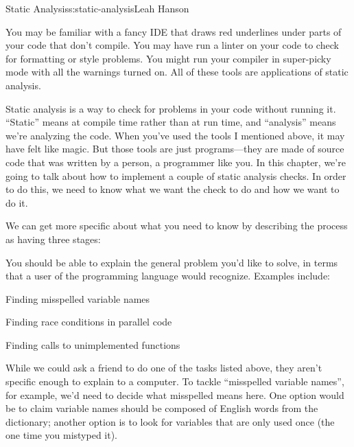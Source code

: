 \begin{aosachapter}{Static Analysis}{s:static-analysis}{Leah Hanson}

\label{introduction}

You may be familiar with a fancy IDE that draws red underlines under
parts of your code that don't compile. You may have run a linter on your
code to check for formatting or style problems. You might run your
compiler in super-picky mode with all the warnings turned on. All of
these tools are applications of static analysis.

Static analysis is a way to check for problems in your code without
running it. ``Static'' means at compile time rather than at run time,
and ``analysis'' means we're analyzing the code. When you've used the
tools I mentioned above, it may have felt like magic. But those tools
are just programs---they are made of source code that was written by a
person, a programmer like you. In this chapter, we're going to talk
about how to implement a couple of static analysis checks. In order to
do this, we need to know what we want the check to do and how we want to
do it.

We can get more specific about what you need to know by describing the
process as having three stages:

\label{deciding-what-you-want-to-check-for.}

You should be able to explain the general problem you'd like to solve,
in terms that a user of the programming language would recognize.
Examples include:

\begin{aosaitemize}

\item
  Finding misspelled variable names
\item
  Finding race conditions in parallel code
\item
  Finding calls to unimplemented functions
\end{aosaitemize}

\label{deciding-how-exactly-to-check-for-it.}

While we could ask a friend to do one of the tasks listed above, they
aren't specific enough to explain to a computer. To tackle ``misspelled
variable names'', for example, we'd need to decide what misspelled means
here. One option would be to claim variable names should be composed of
English words from the dictionary; another option is to look for
variables that are only used once (the one time you mistyped it).


\end{aosachapter}
